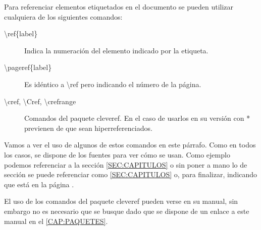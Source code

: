 Para referenciar elementos etiquetados en el documento se pueden utilizar cualquiera de los siguientes comandos:

\begin{description}
  \item [\textbackslash ref\{label\}] Indica la numeración del elemento indicado por la etiqueta.
  \item [\textbackslash pageref\{label\}] Es idéntico a \textbackslash ref pero indicando el número de la página.
  \item [\textbackslash cref, \textbackslash Cref, \textbackslash crefrange ] Comandos del paquete cleveref. En el caso de usarlos en su versión con * previenen de que sean hiperreferenciados.
\end{description}

Vamos a ver el uso de algunos de estos comandos en este párrafo. Como en todos los casos, se dispone de los fuentes para ver cómo se usan. Como ejemplo podemos referenciar a la sección \ref{SEC:CAPITULOS} o sin poner a mano lo de sección se puede referenciar como \cref{SEC:CAPITULOS} o, para finalizar, indicando que está en la página \pageref{SEC:CAPITULOS}.

El uso de los comandos del paquete cleveref pueden verse en su manual, sin embargo no es necesario que se busque dado que se dispone de un enlace a este manual en el \cref{CAP:PAQUETES}.
